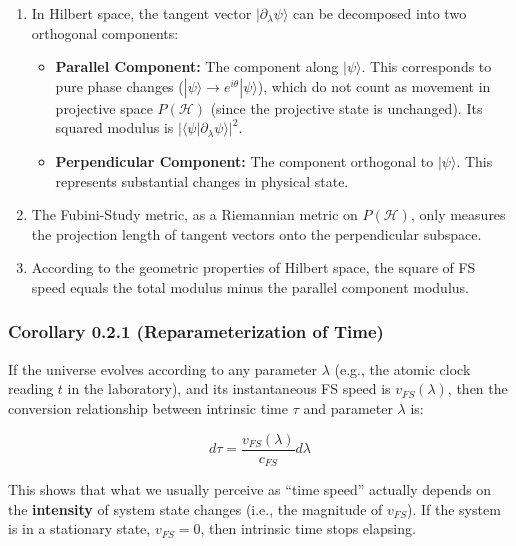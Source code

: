 \documentclass[11pt,a4paper,twoside]{book}
\begin{document}
\begin{enumerate}
\item In Hilbert space, the tangent vector \textbf{$|\partial_{\lambda}\psi\rangle$} can be decomposed into two orthogonal components:

   \begin{itemize}
   \item \textbf{Parallel Component:} The component along \textbf{$|\psi\rangle$}. This corresponds to pure phase changes (\textbf{$|\psi\rangle \to e^{i\theta}|\psi\rangle$}), which do not count as movement in projective space \textbf{$P(\mathcal{H})$} (since the projective state is unchanged). Its squared modulus is \textbf{$|\langle \psi | \partial_{\lambda}\psi \rangle|^2$}.

   \item \textbf{Perpendicular Component:} The component orthogonal to \textbf{$|\psi\rangle$}. This represents substantial changes in physical state.
   \end{itemize}

\item The Fubini-Study metric, as a Riemannian metric on \textbf{$P(\mathcal{H})$}, only measures the projection length of tangent vectors onto the perpendicular subspace.

\item According to the geometric properties of Hilbert space, the square of FS speed equals the total modulus minus the parallel component modulus.
\end{enumerate}

\subsubsection{Corollary 0.2.1 (Reparameterization of Time)}

If the universe evolves according to any parameter \textbf{$\lambda$} (e.g., the atomic clock reading \textbf{$t$} in the laboratory), and its instantaneous FS speed is \textbf{$v_{FS}(\lambda)$}, then the conversion relationship between intrinsic time \textbf{$\tau$} and parameter \textbf{$\lambda$} is:

$$d\tau = \frac{v_{FS}(\lambda)}{c_{FS}} d\lambda$$

This shows that what we usually perceive as ``time speed'' actually depends on the \textbf{intensity} of system state changes (i.e., the magnitude of \textbf{$v_{FS}$}). If the system is in a stationary state, \textbf{$v_{FS}=0$}, then intrinsic time stops elapsing.
\end{document}
